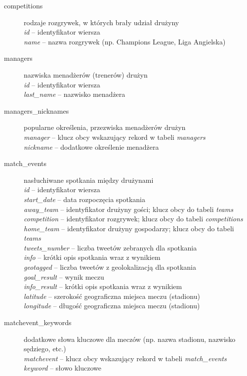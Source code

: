 \begin{description}
\item[competitions] rodzaje rozgrywek, w których brały udział drużyny \\
\textit{id} -- identyfikator wiersza \\
\textit{name} -- nazwa rozgrywek (np. Champions League, Liga Angielska)

\item[managers] nazwiska menadżerów (trenerów) drużyn \\
\textit{id} -- identyfikator wiersza \\
\textit{last\_name} -- nazwisko menadżera

\item[managers\_nicknames] popularne określenia, przezwiska menadżerów drużyn \\
\textit{manager} -- klucz obcy wskazujący rekord w tabeli \textit{managers} \\
\textit{nickname} -- dodatkowe określenie menadżera

\item[match\_events] nasłuchiwane spotkania między drużynami \\ 
\textit{id} -- identyfikator wiersza \\ 
\textit{start\_date} -- data rozpoczęcia spotkania \\
\textit{away\_team} -- identyfikator drużyny gości; klucz obcy do tabeli
\textit{teams}\\
\textit{competition} -- identyfikator rozgrywek; klucz obcy do tabeli
\textit{competitions}\\
\textit{home\_team} -- identyfikator drużyny gospodarzy; klucz obcy do tabeli
\textit{teams}\\
\textit{tweets\_number} -- liczba tweetów zebranych dla spotkania\\
\textit{info} -- krótki opis spotkania wraz z wynikiem\\
\textit{geotagged} -- liczba tweetów z geolokalizacją dla spotkania\\
\textit{goal\_result} -- wynik meczu\\
\textit{info\_result} -- krótki opis spotkania wraz z wynikiem\\
\textit{latitude} -- szerokość geograficzna miejsca meczu (stadionu)\\
\textit{longitude} --  długość geograficzna miejsca meczu (stadionu)


\item[matchevent\_keywords] dodatkowe słowa kluczowe dla meczów (np. nazwa
stadionu, nazwisko sędziego, etc.) \\
\textit{matchevent} -- klucz obcy wskazujący rekord w tabeli
\textit{match\_events} \\
\textit{keyword} -- słowo kluczowe


\end{description}
